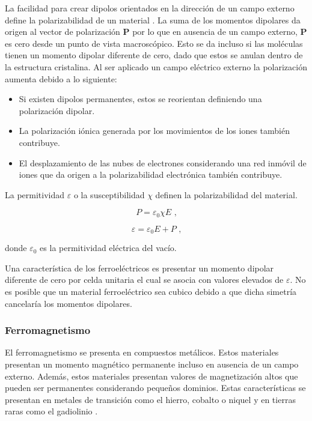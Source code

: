 \noindent La facilidad para crear dipolos orientados en la direcci\'on de un campo externo define la polarizabilidad de un material \cite{smith1993}. La suma de los momentos dipolares da origen al vector de polarizaci\'on {\bf P} por lo que en ausencia de un campo externo, {\bf P} es cero desde un punto de vista macrosc\'opico. Esto se da incluso si las mol\'eculas tienen un momento dipolar diferente de cero, dado que estos se anulan dentro de la estructura cristalina. Al ser aplicado un campo el\'ectrico externo la polarizaci\'on aumenta debido a lo siguiente:

\begin{itemize}
    \item Si existen dipolos permanentes, estos se reorientan definiendo una polarizaci\'on dipolar.
    \item La polarizaci\'on i\'onica generada por los movimientos de los iones tambi\'en contribuye.
    \item El desplazamiento de las nubes de electrones considerando una red inm\'ovil de iones que da origen a la polarizabilidad electr\'onica tambi\'en contribuye.
\end{itemize}

\noindent La permitividad $\varepsilon$ o la susceptibilidad $\chi$ definen la polarizabilidad del material.

\begin{equation}
P = \varepsilon _{0} \chi E
\label{polarizacion} \textrm{ ,}
\end{equation}

\begin{equation}
\varepsilon = \varepsilon _{0}E+P
\label{permitividad} \textrm{ ,}
\end{equation}

\noindent donde $\varepsilon _{0}$ es la permitividad el\'ectrica del vac\'io.

\noindent Una caracter\'istica de los ferroel\'ectricos es presentar un momento dipolar diferente de cero por celda unitaria el cual se asocia con valores elevados de $\varepsilon$. No es posible que un material ferroel\'ectrico sea cubico debido a que dicha simetr\'ia cancelar\'ia los momentos dipolares.

\subsubsection{Ferromagnetismo}

El ferromagnetismo se presenta en compuestos met\'alicos. Estos materiales presentan un momento magn\'etico permanente incluso en ausencia de un campo externo. Adem\'as, estos materiales presentan valores de magnetizaci\'on altos que pueden ser permanentes considerando peque\~nos dominios. Estas caracter\'isticas se presentan en metales de transici\'on como el hierro, cobalto o niquel y en tierras raras como el gadiolinio \cite{kimura2003}.

